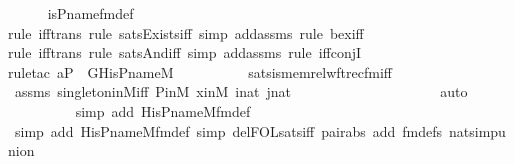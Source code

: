 \begin{isabellebody}
\ \ \ \ \isamarkupfalse%
\ is{\isacharunderscore}{\kern0pt}P{\isacharunderscore}{\kern0pt}name{\isacharunderscore}{\kern0pt}fm{\isacharunderscore}{\kern0pt}def\ \isanewline
\ \ \ \ \isamarkupfalse%
{\isacharparenleft}{\kern0pt}rule\ iff{\isacharunderscore}{\kern0pt}trans{\isacharcomma}{\kern0pt}\ rule\ sats{\isacharunderscore}{\kern0pt}Exists{\isacharunderscore}{\kern0pt}iff{\isacharcomma}{\kern0pt}\ simp\ add{\isacharcolon}{\kern0pt}assms{\isacharcomma}{\kern0pt}\ rule\ bex{\isacharunderscore}{\kern0pt}iff{\isacharparenright}{\kern0pt}\isanewline
\ \ \ \ \isamarkupfalse%
{\isacharparenleft}{\kern0pt}rule\ iff{\isacharunderscore}{\kern0pt}trans{\isacharcomma}{\kern0pt}\ rule\ sats{\isacharunderscore}{\kern0pt}And{\isacharunderscore}{\kern0pt}iff{\isacharcomma}{\kern0pt}\ simp\ add{\isacharcolon}{\kern0pt}assms{\isacharcomma}{\kern0pt}\ rule\ iff{\isacharunderscore}{\kern0pt}conjI{}{\isacharparenright}{\kern0pt}\isanewline
\ \ \ \ \ \isamarkupfalse%
{\isacharparenleft}{\kern0pt}rule{\isacharunderscore}{\kern0pt}tac\ a{\isacharequal}{\kern0pt}P\ \ G{\isacharequal}{\kern0pt}His{\isacharunderscore}{\kern0pt}P{\isacharunderscore}{\kern0pt}name{\isacharunderscore}{\kern0pt}M\ \isanewline
\ \ \ \ \ \ \ \ \ sats{\isacharunderscore}{\kern0pt}is{\isacharunderscore}{\kern0pt}memrel{\isacharunderscore}{\kern0pt}wftrec{\isacharunderscore}{\kern0pt}fm{\isacharunderscore}{\kern0pt}iff{\isacharparenright}{\kern0pt}\isanewline
\ \ \ \ \isamarkupfalse%
\ assms\ singleton{\isacharunderscore}{\kern0pt}in{\isacharunderscore}{\kern0pt}M{\isacharunderscore}{\kern0pt}iff\ P{\isacharunderscore}{\kern0pt}in{\isacharunderscore}{\kern0pt}M\ xinM\ inat\ jnat\isanewline
\ \ \ \ \ \ \ \ \ \ \ \ \ \ \ \ \ \ \ \isamarkupfalse%
\ auto{\isacharbrackleft}{\kern0pt}{}{}{\isacharbrackright}{\kern0pt}\isanewline
\ \ \ \ \ \ \ \ \ \isamarkupfalse%
{\isacharparenleft}{\kern0pt}simp\ add{\isacharcolon}{\kern0pt}\ His{\isacharunderscore}{\kern0pt}P{\isacharunderscore}{\kern0pt}name{\isacharunderscore}{\kern0pt}M{\isacharunderscore}{\kern0pt}fm{\isacharunderscore}{\kern0pt}def{\isacharparenright}{\kern0pt}\isanewline
\ \ \ \ \ \ \ \ \isamarkupfalse%
\ {\isacharparenleft}{\kern0pt}simp\ add{\isacharcolon}{\kern0pt}\ His{\isacharunderscore}{\kern0pt}P{\isacharunderscore}{\kern0pt}name{\isacharunderscore}{\kern0pt}M{\isacharunderscore}{\kern0pt}fm{\isacharunderscore}{\kern0pt}def{\isacharcomma}{\kern0pt}\ simp\ del{\isacharcolon}{\kern0pt}FOL{\isacharunderscore}{\kern0pt}sats{\isacharunderscore}{\kern0pt}iff\ pair{\isacharunderscore}{\kern0pt}abs\ add{\isacharcolon}{\kern0pt}\ fm{\isacharunderscore}{\kern0pt}defs\ nat{\isacharunderscore}{\kern0pt}simp{\isacharunderscore}{\kern0pt}union{\isacharparenright}{\kern0pt}\ \isanewline

\end{isabellebody}
